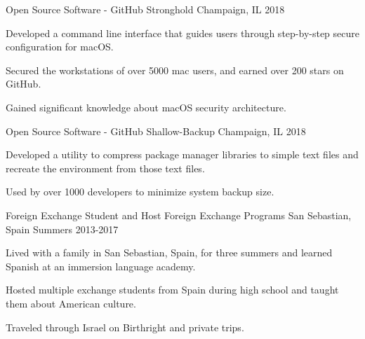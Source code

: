 

\begin{cventries}
\cventry
{Open Source Software - GitHub} %
{Stronghold} %
{Champaign, IL} %
{2018} %
{
	\begin{cvitems} %
		\item {Developed a command line interface that guides users through step-by-step secure configuration for macOS.}
		\item {Secured the workstations of over 5000 mac users, and earned over 200 stars on GitHub.}
		\item{Gained significant knowledge about macOS security architecture.} 
	\end{cvitems}
}
\cventry
{Open Source Software - GitHub} %
{Shallow-Backup} %
{Champaign, IL} %
{2018} %
{
	\begin{cvitems} %
		\item {Developed a utility to compress package manager libraries to simple text files and recreate the environment from those text files.}
		\item {Used by over 1000 developers to minimize system backup size.}
	\end{cvitems}
} 
\cventry
{Foreign Exchange Student and Host} %
{Foreign Exchange Programs} %
{San Sebastian, Spain} %
{Summers 2013-2017} %
{
	\begin{cvitems} %
		\item {Lived with a family in San Sebastian, Spain, for three summers and learned Spanish at an immersion language academy.}
		\item {Hosted multiple exchange students from Spain during high school and taught them about American culture.}
		\item {Traveled through Israel on Birthright and private trips.}
	\end{cvitems}
}
\end{cventries}

